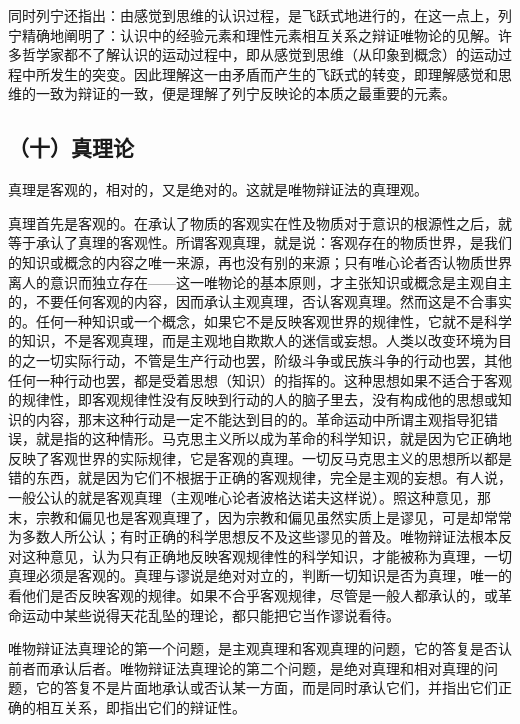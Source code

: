 同时列宁还指出：由感觉到思维的认识过程，是飞跃式地进行的，在这一点上，列宁精确地阐明了：认识中的经验元素和理性元素相互关系之辩证唯物论的见解。许多哲学家都不了解认识的运动过程中，即从感觉到思维（从印象到概念）的运动过程中所发生的突变。因此理解这一由矛盾而产生的飞跃式的转变，即理解感觉和思维的一致为辩证的一致，便是理解了列宁反映论的本质之最重要的元素。

\subsection{（十）真理论}

真理是客观的，相对的，又是绝对的。这就是唯物辩证法的真理观。

真理首先是客观的。在承认了物质的客观实在性及物质对于意识的根源性之后，就等于承认了真理的客观性。所谓客观真理，就是说：客观存在的物质世界，是我们的知识或概念的内容之唯一来源，再也没有别的来源；只有唯心论者否认物质世界离人的意识而独立存在——这一唯物论的基本原则，才主张知识或概念是主观自主的，不要任何客观的内容，因而承认主观真理，否认客观真理。然而这是不合事实的。任何一种知识或一个概念，如果它不是反映客观世界的规律性，它就不是科学的知识，不是客观真理，而是主观地自欺欺人的迷信或妄想。人类以改变环境为目的之一切实际行动，不管是生产行动也罢，阶级斗争或民族斗争的行动也罢，其他任何一种行动也罢，都是受着思想（知识）的指挥的。这种思想如果不适合于客观的规律性，即客观规律性没有反映到行动的人的脑子里去，没有构成他的思想或知识的内容，那末这种行动是一定不能达到目的的。革命运动中所谓主观指导犯错误，就是指的这种情形。马克思主义所以成为革命的科学知识，就是因为它正确地反映了客观世界的实际规律，它是客观的真理。一切反马克思主义的思想所以都是错的东西，就是因为它们不根据于正确的客观规律，完全是主观的妄想。有人说，一般公认的就是客观真理（主观唯心论者波格达诺夫这样说）。照这种意见，那末，宗教和偏见也是客观真理了，因为宗教和偏见虽然实质上是谬见，可是却常常为多数人所公认；有时正确的科学思想反不及这些谬见的普及。唯物辩证法根本反对这种意见，认为只有正确地反映客观规律性的科学知识，才能被称为真理，一切真理必须是客观的。真理与谬说是绝对对立的，判断一切知识是否为真理，唯一的看他们是否反映客观的规律。如果不合乎客观规律，尽管是一般人都承认的，或革命运动中某些说得天花乱坠的理论，都只能把它当作谬说看待。

唯物辩证法真理论的第一个问题，是主观真理和客观真理的问题，它的答复是否认前者而承认后者。唯物辩证法真理论的第二个问题，是绝对真理和相对真理的问题，它的答复不是片面地承认或否认某一方面，而是同时承认它们，并指出它们正确的相互关系，即指出它们的辩证性。

